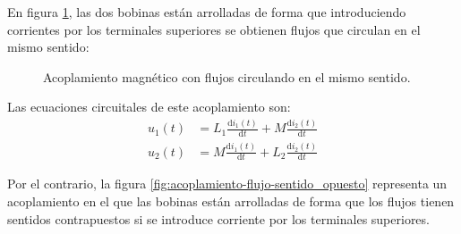   En figura \ref{fig:acoplamiento-flujo-mismo_sentido}, las dos
  bobinas están arrolladas de forma que introduciendo corrientes por
  los terminales superiores se obtienen flujos que circulan en el
  mismo sentido:
  \begin{figure}[H]
    \centering
    \hspace{1cm}
    \caption{Acoplamiento magnético con flujos circulando en el mismo sentido.}
    \label{fig:acoplamiento-flujo-mismo_sentido}
  \end{figure}
  
Las ecuaciones circuitales de este acoplamiento son:
\begin{align*}
  u_1(t) &= L_1 \frac{\mathrm{d}i_1(t)}{\mathrm{d}t} + M \frac{\mathrm{d}i_2(t)}{\mathrm{d}t}\\
  u_2(t) &= M \frac{\mathrm{d}i_1(t)}{\mathrm{d}t} + L_2 \frac{\mathrm{d}i_2(t)}{\mathrm{d}t}
\end{align*}

Por el contrario, la figura
\ref{fig:acoplamiento-flujo-sentido_opuesto} representa un
acoplamiento en el que las bobinas están arrolladas de forma que los
flujos tienen sentidos contrapuestos si se introduce corriente por los
terminales superiores.

